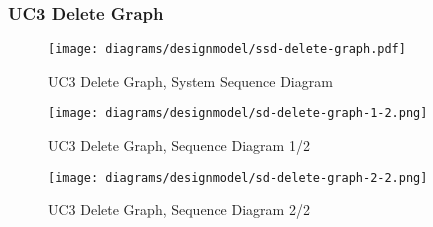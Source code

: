 \subsubsection{UC3 Delete Graph}
\begin{figure}[H]
    \centering
    \texttt{[image: diagrams/designmodel/ssd-delete-graph.pdf]}
    \caption{UC3 Delete Graph, System Sequence Diagram}
    \label{fig:delete-graph-ssd}
\end{figure}
\begin{figure}[p]%
  \begin{leftfullpage}
    \texttt{[image: diagrams/designmodel/sd-delete-graph-1-2.png]}
    \caption{UC3 Delete Graph, Sequence Diagram 1/2}
    \label{fig:delete-graph-sd-1}
  \end{leftfullpage}
\end{figure}
\begin{figure}[p]%
  \begin{fullpage}
    \texttt{[image: diagrams/designmodel/sd-delete-graph-2-2.png]}
    \caption{UC3 Delete Graph, Sequence Diagram 2/2}
    \label{fig:delete-graph-sd-2}
  \end{fullpage}
\end{figure}
% 
